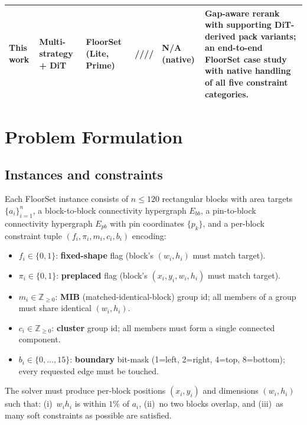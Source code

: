 \documentclass[nolineno]{ieeeaccess}
\begin{document}
\begin{table}[t]
\begin{tabularx}{\textwidth}{L{2.2cm}L{2.0cm}L{2.6cm}L{1.5cm}L{1.9cm}Y}
\midrule
\textbf{This work} & \textbf{Multi-strategy + DiT} & \textbf{FloorSet (Lite, Prime)} & \textbf{////} & \textbf{N/A (native)} & Gap-aware rerank with supporting DiT-derived pack variants; an end-to-end FloorSet case study with native handling of all five constraint categories.\\
\bottomrule
\end{tabularx}
\end{table}

\section{Problem Formulation}
\label{sec:problem}

\subsection{Instances and constraints}
Each FloorSet instance consists of $n\le 120$ rectangular
blocks with area targets $\{a_i\}_{i=1}^n$, a block-to-block
connectivity hypergraph $E_{bb}$, a pin-to-block connectivity
hypergraph $E_{pb}$ with pin coordinates $\{p_k\}$, and a per-block
constraint tuple $(f_i,\pi_i,m_i,c_i,b_i)$ encoding:

\begin{itemize}[leftmargin=1.1em]
    \item $f_i \in \{0,1\}$: \textbf{fixed-shape} flag (block's $(w_i,h_i)$ must match target).
    \item $\pi_i \in \{0,1\}$: \textbf{preplaced} flag (block's $(x_i,y_i,w_i,h_i)$ must match target).
    \item $m_i \in \mathbb{Z}_{\ge 0}$: \textbf{MIB} (matched-identical-block) group id; all members of a group must share identical $(w_i,h_i)$.
    \item $c_i \in \mathbb{Z}_{\ge 0}$: \textbf{cluster} group id; all members must form a single connected component.
    \item $b_i \in \{0,\ldots,15\}$: \textbf{boundary} bit-mask
    (1=left, 2=right, 4=top, 8=bottom); every requested edge must be touched.
\end{itemize}

The solver must produce per-block positions $(x_i,y_i)$ and dimensions
$(w_i,h_i)$ such that: (i)~$w_i h_i$ is within $1\%$ of $a_i$,
(ii)~no two blocks overlap, and (iii)~as many soft constraints as
possible are satisfied.
\end{document}

